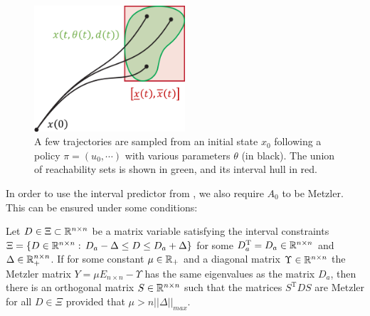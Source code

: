 \documentclass{article}
\begin{document}
\begin{figure}
    \centering
    \includegraphics[width=0.5\textwidth]{img/interval-hull}
    \caption{A few trajectories are sampled from an initial state $x_0$ following a policy $\pi=(u_0,\cdots)$ with various parameters $\theta$ (in black). The union of reachability sets is shown in green, and its interval hull in red.}
    \label{fig:interval-hull}
\end{figure}

In order to use the interval predictor from \citep{leurent2019interval}, we also require $A_0$ to be Metzler. This can be ensured under some conditions:

\begin{lemma}
\label{lem:metzler} Let $D\in\Xi\subset\mathbb{R}^{n\times n}$ be a matrix variable satisfying the interval constraints $\Xi=\{D\in\mathbb{R}^{n\times n}:\,D_{a}-\Delta\le D\le D_{a}+\Delta\}$ for some $D_{a}^{\text{T}}=D_{a}\in\mathbb{R}^{n\times n}$ and $\Delta\in\mathbb{R}_{+}^{n\times n}$. If for some constant $\mu\in\mathbb{R}_{+}$ and a diagonal matrix $\Upsilon\in\mathbb{R}^{n\times n}$ the Metzler matrix $Y=\mu E_{n\times n}-\Upsilon$ has the same eigenvalues as the matrix $D_{a}$, then there is an orthogonal matrix $S\in\mathbb{R}^{n\times n}$ such that the matrices $S^{\text{T}}DS$ are Metzler for all $D\in\Xi$ provided that $\mu>n||\Delta||_{max}$.\textup{ }
\end{lemma}
\end{document}
